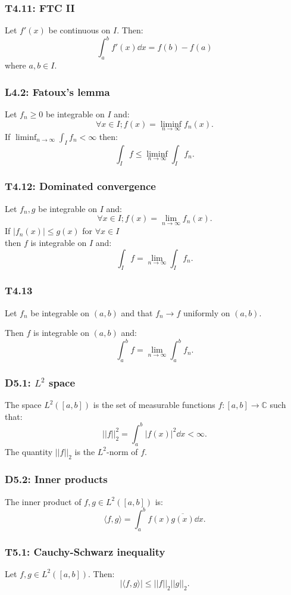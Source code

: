 \documentclass{article}
\begin{document}
\begin{multicols*}{3}
\subsubsection*{T4.11: FTC II}
Let $f'(x)$ be continuous on $I$. Then:
$$\int_{a}^{b}f'(x)\dd x=f(b)-f(a)$$
where $a,b\in I$.

\subsubsection*{L4.2: Fatoux's lemma}
Let $f_n\geq0$ be integrable on $I$ and:
$$\forall x\in I;f(x)=\liminf_{n\rightarrow\infty}f_n(x).$$
If $\displaystyle\liminf_{n\rightarrow\infty}
\int_I f_n<\infty$ then:
$$\int_I f\leq\liminf_{n\rightarrow\infty}\int_I f_n.$$

\subsubsection*{T4.12: Dominated convergence}
Let $f_n,g$ be integrable on $I$ and:
$$\forall x\in I; f(x)=\lim_{n\rightarrow\infty}f_n(x).$$
If $|f_n(x)|\leq g(x)$ for $\forall x\in I$ \\
then $f$ is integrable on $I$ and:
$$\int_I f=\lim_{n\rightarrow\infty}\int_I f_n.$$

\subsubsection*{T4.13}
Let $f_n$ be integrable on $(a,b)$ and that
$f_n\rightarrow f$ uniformly on $(a,b)$.

Then $f$ is integrable on $(a,b)$ and:
$$\int_{a}^{b}f=\lim_{n\rightarrow\infty}\int_{a}^{b}f_n.$$

\subsubsection*{D5.1: $L^2$ space}
The space $L^2([a,b])$ is the set of measurable functions 
$f:[a,b]\rightarrow\mathbb{C}$ such that:
$$||f||_2^2=\int_{a}^{b}|f(x)|^2\dd x<\infty.$$
The quantity $||f||_2$ is the $L^2$-norm of $f$.

\subsubsection*{D5.2: Inner products}
The inner product of $f,g\in L^2([a,b])$ is:
$$\langle f,g\rangle=
\int_{a}^{b}f(x)\overline{g(x)}\dd x.$$

\subsubsection*{T5.1: Cauchy-Schwarz inequality}
Let $f,g\in L^2([a,b])$. Then:
$$|\langle f,g\rangle|\leq||f||_2||g||_2.$$


\end{multicols*}
\end{document}
